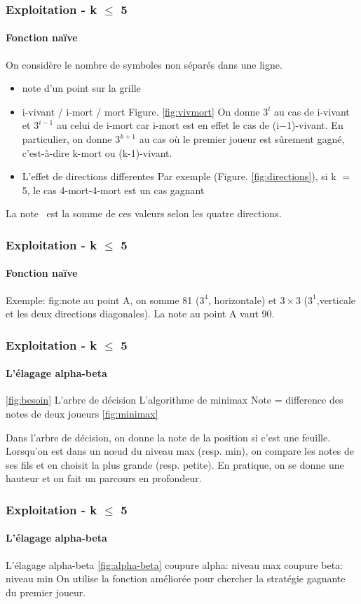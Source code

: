 \documentclass{beamer}
\begin{document}
\begin{frame}
    \frametitle{Exploitation - k $\le$ 5}
    \framesubtitle{Fonction naïve}
    On considère le nombre de symboles non séparés dans une ligne.
    \begin{itemize}
        \item note d'un point sur la grille
        \item i-vivant / i-mort / mort
            {Figure. \ref{fig:vivmort}}
On donne $3^{i}$ au cas de i-vivant et $3^{i-1}$ au celui de i-mort car i-mort est en effet le cas de (i$-$1)-vivant. En particulier, on donne $3^{k+1}$ au cas où le premier joueur est sûrement gagné, c'est-à-dire k-mort ou (k-1)-vivant. 
        \item L'effet de directions differentes
Par exemple (Figure. \ref{fig:directions}), si k $=$ 5, le cas 4-mort-4-mort est un cas gagnant 
    \end{itemize}
    La \og note \fg \ est la somme de ces valeurs selon les quatre directions. 
\end{frame}

\begin{frame}
    \frametitle{Exploitation - k $\le$ 5}
    \framesubtitle{Fonction naïve}
    Exemple: fig:note
au point A, on somme 81 ($3^{4}$, horizontale) et $3\times 3$ ($3^1$,verticale et les deux directions diagonales). La note au point A vaut 90.
\end{frame}

\begin{frame}
    \frametitle{Exploitation - k $\le$ 5}
    \framesubtitle{L'élagage alpha-beta}
    \ref{fig:besoin}
    L'arbre de décision
    L'algorithme de minimax
        Note = difference des notes de deux joueurs
\ref{fig:minimax}

Dans l'arbre de décision, on donne la note de la position si c'est une feuille. Lorsqu'on est dans un nœud du niveau max (resp. min), on compare les notes de ses fils et en choisit la plus grande (resp. petite). En pratique, on se donne une hauteur et on fait un parcours en profondeur.\par
\end{frame}


\begin{frame}
    \frametitle{Exploitation - k $\le$ 5}
    \framesubtitle{L'élagage alpha-beta}
    L'élagage alpha-beta
    \ref{fig:alpha-beta}
    coupure alpha: niveau max
    coupure beta: niveau min
On utilise la fonction améliorée pour chercher la stratégie gagnante du premier joueur.
\end{frame}
\end{document}
